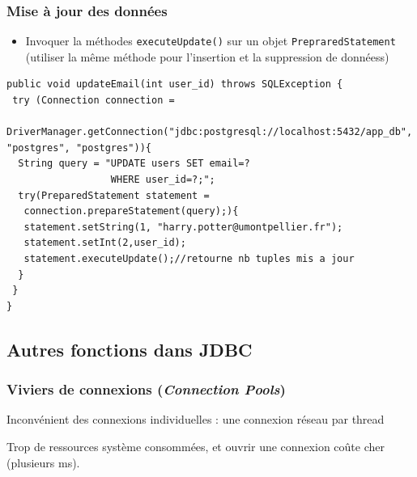 \documentclass[aspectratio=169,10pt]{beamer}
\begin{document}
\begin{frame}[fragile]
	\frametitle{Mise à jour des données}
	\begin{itemize}
		\item Invoquer la méthodes \texttt{executeUpdate()} sur un objet \texttt{PrepraredStatement} (utiliser la même méthode pour l'insertion et la suppression de donnéess)
	\end{itemize}
\begin{lstlisting}[basicstyle=\lstcode\scriptsize]
public void updateEmail(int user_id) throws SQLException {
 try (Connection connection = 
  DriverManager.getConnection("jdbc:postgresql://localhost:5432/app_db", "postgres", "postgres")){
  String query = "UPDATE users SET email=?
                  WHERE user_id=?;";
  try(PreparedStatement statement = 
   connection.prepareStatement(query);){
   statement.setString(1, "harry.potter@umontpellier.fr");
   statement.setInt(2,user_id);
   statement.executeUpdate();//retourne nb tuples mis a jour
  }
 }
}
\end{lstlisting}
\end{frame}


\subsection{Autres fonctions dans JDBC}


\begin{frame}
  \frametitle{Viviers de connexions (\textit{Connection Pools})}
  Inconvénient des connexions individuelles : \alert{une connexion réseau par thread}
  \begin{center}
  \end{center}
  Trop de ressources système consommées, et ouvrir une connexion coûte cher (plusieurs ms).
\end{frame}
\end{document}
